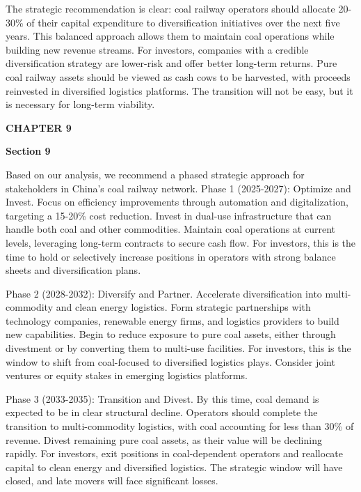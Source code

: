 \documentclass[10pt,a4paper]{article}
\begin{document}
{\small {\small The strategic recommendation is clear: coal railway operators should allocate 20-30\% of their capital expenditure to diversification initiatives over the next five years. This balanced approach allows them to maintain coal operations while building new revenue streams. For investors, companies with a credible diversification strategy are lower-risk and offer better long-term returns. Pure coal railway assets should be viewed as cash cows to be harvested, with proceeds reinvested in diversified logistics platforms. The transition will not be easy, but it is necessary for long-term viability.}}

\clearpage
{\textcolor{BOBlue}{\scriptsize\bfseries CHAPTER 9}}\par\vspace{-1pt}
{\Large\sffamily\bfseries\color{BONavy} Section 9}\par\vspace{4pt}
{\small Based on our analysis, we recommend a phased strategic approach for stakeholders in China's coal railway network. Phase 1 (2025-2027): Optimize and Invest. Focus on efficiency improvements through automation and digitalization, targeting a 15-20\% cost reduction. Invest in dual-use infrastructure that can handle both coal and other commodities. Maintain coal operations at current levels, leveraging long-term contracts to secure cash flow. For investors, this is the time to hold or selectively increase positions in operators with strong balance sheets and diversification plans.}

{\small Phase 2 (2028-2032): Diversify and Partner. Accelerate diversification into multi-commodity and clean energy logistics. Form strategic partnerships with technology companies, renewable energy firms, and logistics providers to build new capabilities. Begin to reduce exposure to pure coal assets, either through divestment or by converting them to multi-use facilities. For investors, this is the window to shift from coal-focused to diversified logistics plays. Consider joint ventures or equity stakes in emerging logistics platforms.}

{\small Phase 3 (2033-2035): Transition and Divest. By this time, coal demand is expected to be in clear structural decline. Operators should complete the transition to multi-commodity logistics, with coal accounting for less than 30\% of revenue. Divest remaining pure coal assets, as their value will be declining rapidly. For investors, exit positions in coal-dependent operators and reallocate capital to clean energy and diversified logistics. The strategic window will have closed, and late movers will face significant losses.}
\vspace{3pt}\noindent{}\vspace{4pt}
\end{document}
